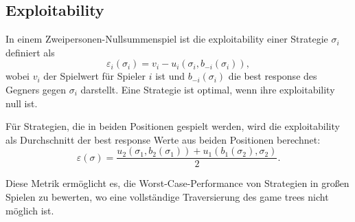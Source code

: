 \subsection{Exploitability}

In einem Zweipersonen-Nullsummenspiel ist die exploitability einer Strategie $\sigma_i$ definiert als
\begin{equation}
\varepsilon_i(\sigma_i) = v_i - u_i(\sigma_i, b_{-i}(\sigma_i)),
\end{equation}
wobei $v_i$ der Spielwert für Spieler $i$ ist und $b_{-i}(\sigma_i)$ die best response des Gegners gegen $\sigma_i$ darstellt.
Eine Strategie ist optimal, wenn ihre exploitability null ist.

Für Strategien, die in beiden Positionen gespielt werden, wird die exploitability als Durchschnitt der best response Werte aus beiden Positionen berechnet:
\begin{equation}
\varepsilon(\sigma) = \frac{u_2(\sigma_1, b_2(\sigma_1)) + u_1(b_1(\sigma_2), \sigma_2)}{2}.
\end{equation}

Diese Metrik ermöglicht es, die Worst-Case-Performance von Strategien in großen Spielen zu bewerten, wo eine vollständige Traversierung des game trees nicht möglich ist.
